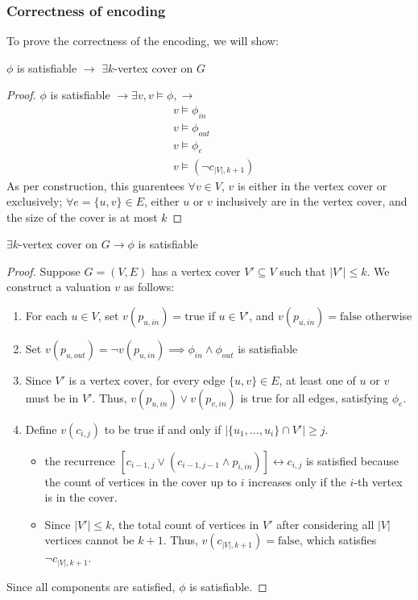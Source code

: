 \documentclass{article}
\newtheorem{theorem}{Theorem}[section]
\let\oldtheorem\theorem
\let\endoldtheorem\endtheorem
\renewenvironment{theorem}
  {\begin{tcolorbox}[
      colback=yellow!6,
      colframe=yellow!60!black,
      boxrule=0.6pt,
      arc=2pt,
      left=6pt,right=6pt,top=4pt,bottom=4pt,
      parbox=false
    ]\oldtheorem}
  {\endoldtheorem\end{tcolorbox}}
\begin{document}
\subsubsection*{Correctness of encoding}
To prove the correctness of the encoding, we will show:
\begin{theorem}
    $\phi$ is satisfiable $\rightarrow$ $\exists k$-vertex cover on $G$
\end{theorem}
\begin{proof}
    $\phi$ is satisfiable $\rightarrow \exists v, v\models \phi, \rightarrow$
    \begin{align*}
        &v\models \phi_{in}\\
        &v\models \phi_{out}\\
        &v\models \phi_e\\
        &v\models (\neg c_{|V|, k+1})
    \end{align*}
    As per construction, this guarentees $\forall v \in V$, $v$ is either in the vertex cover or  exclusively; $\forall e=\{u, v\} \in E$, 
    either $u$ or $v$ inclusively are in the vertex cover, and the size of the cover is at most $k$
\end{proof}
\begin{theorem}
    $\exists k$-vertex cover on $G \rightarrow \phi$ is satisfiable
\end{theorem}
\begin{proof}
Suppose $G = (V, E)$ has a vertex cover $V' \subseteq V$ such that $|V'| \leq k$. We construct a valuation $v$ as follows:
\begin{enumerate}
    \item For each $u \in V$, set $v(p_{u, in}) = \text{true}$ if $u \in V'$, and $v(p_{u, in}) = \text{false}$ otherwise
    \item Set $v(p_{u, out}) = \neg v(p_{u, in}) \implies \phi_{in} \land \phi_{out}$ is satisfiable
    \item Since $V'$ is a vertex cover, for every edge $\{u, v\} \in E$, at least one of $u$ or $v$ must be in $V'$. Thus, $v(p_{u, in}) \lor v(p_{v, in})$ is true for all edges, satisfying $\phi_e$.
    \item Define $v(c_{i, j})$ to be true if and only if $|\{u_1, \dots, u_i\} \cap V'| \geq j$. 
    \begin{itemize}
        \item the recurrence $[c_{i-1, j} \lor (c_{i-1, j-1} \land p_{i, in})] \leftrightarrow c_{i, j}$ is satisfied because the count of vertices in the cover up to $i$ increases only if the $i$-th vertex is in the cover.
        \item Since $|V'| \leq k$, the total count of vertices in $V'$ after considering all $|V|$ vertices cannot be $k+1$. Thus, $v(c_{|V|, k+1}) = \text{false}$, which satisfies $\neg c_{|V|, k+1}$.
    \end{itemize}
\end{enumerate}
Since all components are satisfied, $\phi$ is satisfiable.
\end{proof}
\end{document}
